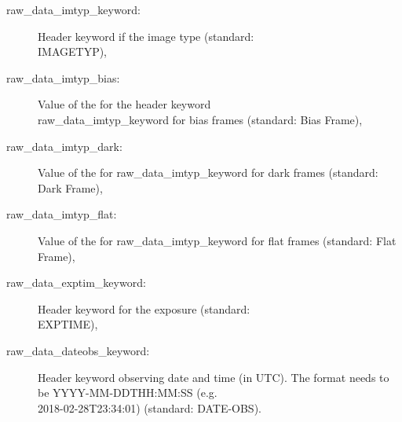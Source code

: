 \documentclass[10pt,a4paper]{article}
\begin{document}
\begin{description}
  \item[raw\_data\_imtyp\_keyword:] Header keyword if the image type (standard: \\ \mbox{IMAGETYP}),
  \item[raw\_data\_imtyp\_bias:] Value of the for the header keyword \\ raw\_data\_imtyp\_keyword for bias frames (standard: Bias Frame),
  \item[raw\_data\_imtyp\_dark:] Value of the for raw\_data\_imtyp\_keyword for dark frames (standard: Dark Frame),
  \item[raw\_data\_imtyp\_flat:] Value of the for raw\_data\_imtyp\_keyword for flat frames (standard: Flat Frame),
  \item[raw\_data\_exptim\_keyword:] Header keyword for the exposure (standard: \\ \mbox{EXPTIME}),
  \item[raw\_data\_dateobs\_keyword:] Header keyword observing date and time (in UTC). The format needs to be \mbox{YYYY-MM-DDTHH:MM:SS} (e.g. \\ \mbox{2018-02-28T23:34:01})  (standard: \mbox{DATE-OBS}).
\end{description}
\end{document}
